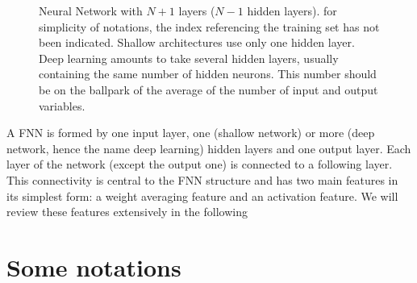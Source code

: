 \begin{figure}[H]
\begin{center}
\caption{\label{fig:1}Neural Network with $N+1$ layers ($N-1$ hidden layers). for simplicity of notations, the index referencing the training set has not been indicated. Shallow architectures use only one hidden layer. Deep learning amounts to take several hidden layers, usually containing the same number of hidden neurons. This number should be on the ballpark of the average of the number of input and output variables.}
\end{center}
\end{figure}

A FNN is formed by one input layer, one (shallow network) or more (deep network, hence the name deep learning) hidden layers and one output layer. Each layer of the network (except the output one) is connected to a following layer. This connectivity is central to the FNN structure and has two main features in its simplest form: a weight averaging feature and an activation feature. We will review these features extensively in the following

\section{Some notations}

